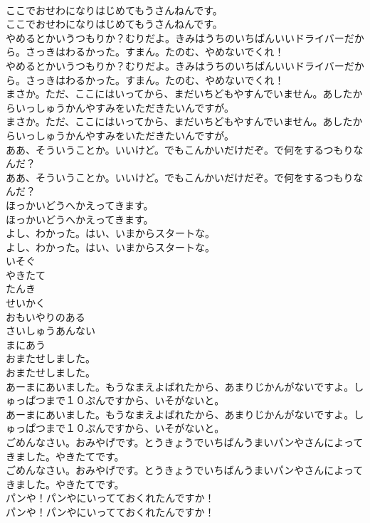 \documentclass[8pt]{extreport}
\begin{document}
\begin{CJK}{UTF8}{min}
\\	ここでおせわになりはじめてもうさんねんです。
\\	ここでおせわになりはじめてもうさんねんです。
\\	やめるとかいうつもりか？むりだよ。きみはうちのいちばんいいドライバーだから。さっきはわるかった。すまん。たのむ、やめないでくれ！
\\	やめるとかいうつもりか？むりだよ。きみはうちのいちばんいいドライバーだから。さっきはわるかった。すまん。たのむ、やめないでくれ！
\\	まさか。ただ、ここにはいってから、まだいちどもやすんでいません。あしたからいっしゅうかんやすみをいただきたいんですが。
\\	まさか。ただ、ここにはいってから、まだいちどもやすんでいません。あしたからいっしゅうかんやすみをいただきたいんですが。
\\	ああ、そういうことか。いいけど。でもこんかいだけだぞ。で何をするつもりなんだ？
\\	ああ、そういうことか。いいけど。でもこんかいだけだぞ。で何をするつもりなんだ？
\\	ほっかいどうへかえってきます。
\\	ほっかいどうへかえってきます。
\\	よし、わかった。はい、いまからスタートな。
\\	よし、わかった。はい、いまからスタートな。
\\	いそぐ
\\	やきたて
\\	たんき
\\	せいかく
\\	おもいやりのある
\\	さいしゅうあんない
\\	まにあう
\\	おまたせしました。
\\	おまたせしました。
\\	あーまにあいました。もうなまえよばれたから、あまりじかんがないですよ。しゅっぱつまで１０ぷんですから、いそがないと。
\\	あーまにあいました。もうなまえよばれたから、あまりじかんがないですよ。しゅっぱつまで１０ぷんですから、いそがないと。
\\	ごめんなさい。おみやげです。とうきょうでいちばんうまいパンやさんによってきました。やきたてです。
\\	ごめんなさい。おみやげです。とうきょうでいちばんうまいパンやさんによってきました。やきたてです。
\\	パンや！パンやにいってておくれたんですか！
\\	パンや！パンやにいってておくれたんですか！

\end{CJK}
\end{document}
